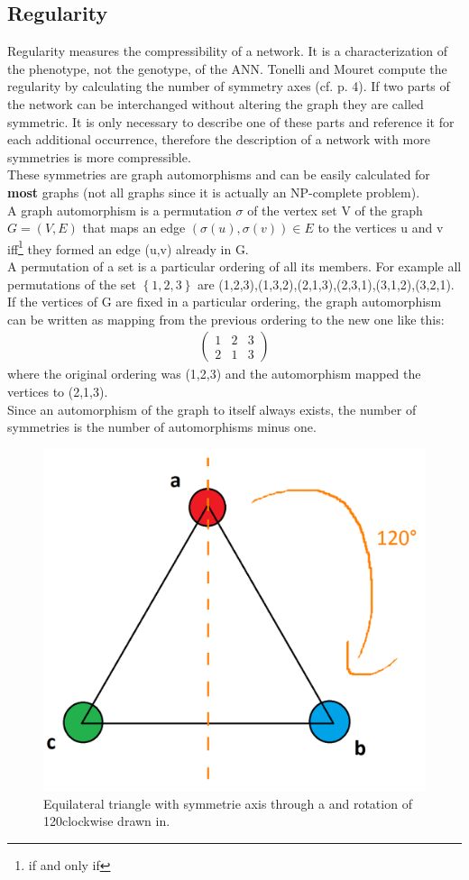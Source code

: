 \documentclass[12pt,twoside]{article}
\theoremstyle{plain}
\theoremstyle{definition}
\theoremstyle{remark}
\begin{document}
\subsection{Regularity}
\label{regularity}
Regularity measures the compressibility of a network. It is a characterization of the phenotype, not the genotype, of the ANN.
Tonelli and Mouret compute the regularity by calculating the number of symmetry axes (cf. \cite{citeulike:12788284} p. 4).
If two parts of the network can be interchanged without altering the graph they are called symmetric.
It is only necessary to describe one of these parts and reference it for each additional occurrence, therefore the description of a network with more symmetries is more compressible.\\
These symmetries are graph automorphisms and can be easily calculated for \textbf{most} graphs (not all graphs since it is actually an NP-complete problem).\\
A graph automorphism is a permutation $\sigma$ of the vertex set V of the graph $G = (V,E)$ that maps an edge $(\sigma(u),\sigma(v)) \in E$ to the vertices u and v iff\footnote{if and only if} they formed an edge (u,v) already in G.\\
A permutation of a set is a particular ordering of all its members. For example all permutations of the set $\left\{ 1,2,3 \right\}$ are (1,2,3),(1,3,2),(2,1,3),(2,3,1),(3,1,2),(3,2,1). If the vertices of G are fixed in a particular ordering, the graph automorphism can be written as mapping from the previous ordering to the new one like this:
\begin{align*}
\begin{pmatrix}
1 & 2 & 3 \\
2 & 1 & 3
\end{pmatrix}
\end{align*}
where the original ordering was (1,2,3) and the automorphism mapped the vertices to (2,1,3).\\
Since an automorphism of the graph to itself always exists, the number of symmetries is the number of automorphisms minus one.\medskip

\begin{figure}[!bth]
	\begin{center}
		\includegraphics[width=.43\textwidth]{GleichseitigUndGeschmeidig.png}
	\end{center}
	\caption{Equilateral triangle with symmetrie axis through a and rotation of 120\degree clockwise drawn in.}
	\label{fig:dreieck}
\end{figure}
\end{document}
